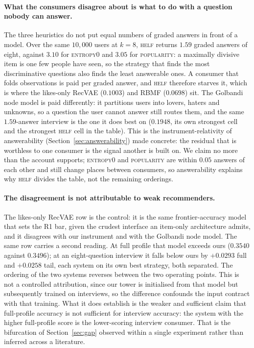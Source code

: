 \documentclass[manuscript,screen]{acmart}
\begin{document}
\paragraph{What the consumers disagree about is what to do with a question nobody can answer.} The three heuristics do not put equal numbers of graded answers in front of a model. Over the same $10{,}000$ users at $k{=}8$, \textsc{helf} returns $1.59$ graded answers of eight, against $3.10$ for \textsc{entropy0} and $3.05$ for \textsc{popularity}: a maximally divisive item is one few people have seen, so the strategy that finds the most discriminative questions also finds the least answerable ones. A consumer that folds observations is paid per graded answer, and \textsc{helf} therefore starves it, which is where the likes-only RecVAE ($0.1003$) and RBMF ($0.0698$) sit. The Golbandi node model is paid differently: it partitions users into lovers, haters and unknowns, so a question the user cannot answer still routes them, and the same $1.59$-answer interview is the one it does best on ($0.1948$, its own strongest cell and the strongest \textsc{helf} cell in the table). This is the instrument-relativity of answerability (Section~\ref{sec:answerability}) made concrete: the residual that is worthless to one consumer is the signal another is built on. We claim no more than the account supports; \textsc{entropy0} and \textsc{popularity} are within $0.05$ answers of each other and still change places between consumers, so answerability explains why \textsc{helf} divides the table, not the remaining orderings.

\paragraph{The disagreement is not attributable to weak recommenders.} The likes-only RecVAE row is the control: it is the same frontier-accuracy model that sets the R1 bar, given the crudest interface an item-only architecture admits, and it disagrees with our instrument and with the Golbandi node model. The same row carries a second reading. At full profile that model exceeds ours ($0.3540$ against $0.3496$); at an eight-question interview it falls below ours by $+0.0293$ full and $+0.0258$ tail, each system on its own best strategy, both separated. The ordering of the two systems reverses between the two operating points. This is not a controlled attribution, since our tower is initialised from that model but subsequently trained on interviews, so the difference confounds the input contract with that training. What it does establish is the weaker and sufficient claim that full-profile accuracy is not sufficient for interview accuracy: the system with the higher full-profile score is the lower-scoring interview consumer. That is the bifurcation of Section~\ref{sec:gap} observed within a single experiment rather than inferred across a literature.
\end{document}

